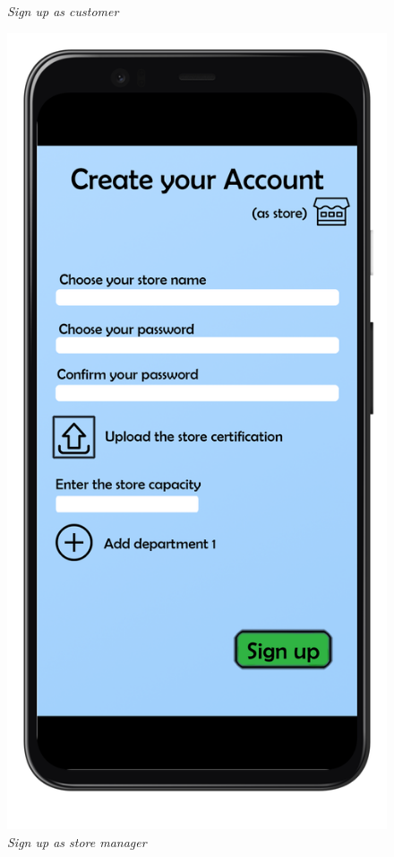 \documentclass{article}
\begin{document}
\begin{figure}[!h]
\begin{minipage}[!h]{0.4\textwidth}
				\caption{\emph{Sign up as customer}}
			\end{minipage}
			\hfill
			\begin{minipage}[!h]{0.4\textwidth}
				\includegraphics[width=\textwidth]{../Mockups/SignUpStore.png}
				\caption{\emph{Sign up as store manager}}
			\end{minipage}
		\end{figure}
		
\end{document}
